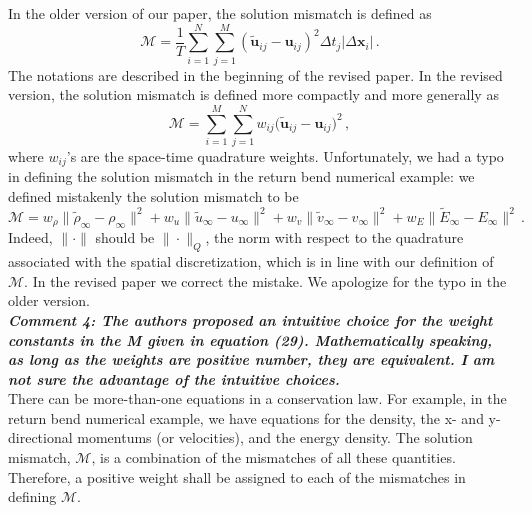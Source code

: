 \documentclass[a4paper,twoside]{article}
\begin{document}
In the older version of our paper, the solution mismatch is defined as
$$
    \mathcal{M} = \frac{1}{T} \sum_{i=1}^N \sum_{j=1}^M \left(\tilde{\boldsymbol{u}}_{ij}
    - \boldsymbol{u}_{ij}\right)^2 \Delta t_j |\Delta \boldsymbol{x}_i|\,.
$$
The notations are described in the beginning of the revised paper. 
In the revised version, the solution mismatch is defined more compactly and more generally as
\begin{equation*}
    \mathcal{M} = \sum_{i=1}^M \sum_{j=1}^N w_{ij} \big( \tilde{\boldsymbol{u}}_{ij}
     -\boldsymbol{u}_{ij}\big)^2 \,,
    \label{eqn: solution mismatch}
\end{equation*}
where $w_{ij}$'s are the space-time quadrature weights. Unfortunately, we had a typo
in defining the solution mismatch in the return bend numerical example:
we defined mistakenly the solution mismatch to be
$$
    \mathcal{M} = w_\rho \|\tilde{\rho}_\infty - \rho_\infty\|^2 
    + w_u \|\tilde{u}_\infty - u_\infty\|^2 
    + w_v \|\tilde{v}_\infty - v_\infty\|^2
    +w_E \|\tilde{E}_\infty - E_\infty\|^2\,.
$$
Indeed, $\|\cdot\|$ should be $\|\cdot\|_Q$, the norm with respect to the quadrature associated with 
the spatial discretization, which is in line with our definition of $\mathcal{M}$.
In the revised paper we correct the mistake. We apologize for the typo in the older version.\\


\emph{\textbf{Comment 4:
The authors proposed an intuitive choice for the weight constants in the M given in equation (29). Mathematically speaking, as long as the weights are positive number, they are equivalent. I am not sure the advantage of the intuitive choices.}}\\

There can be more-than-one equations in a conservation law. For example, in
the return bend numerical example, we have equations for the density, the
x- and y-directional momentums (or velocities), 
and the energy density. The solution mismatch, $\mathcal{M}$, is a combination of the mismatches
of all these quantities. 
Therefore, a positive weight shall be assigned to each of the mismatches in defining $\mathcal{M}$.\\
\end{document}
